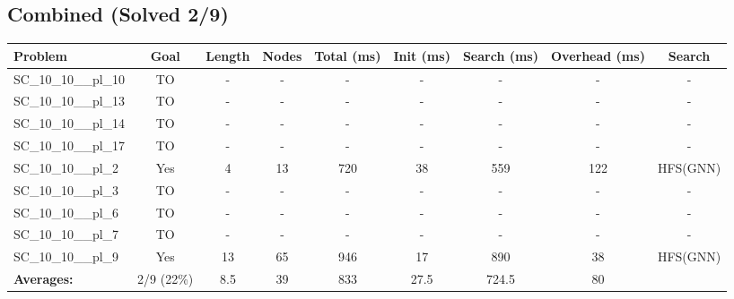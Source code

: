 \documentclass{article}
\begin{document}
\subsection*{Combined (Solved 2/9)}
\begin{tabular}{lcccccccc}
\toprule
Problem & Goal & Length & Nodes & Total (ms) & Init (ms) & Search (ms) & Overhead (ms) & Search \\
\midrule
SC\_10\_10\_\_pl\_10 & TO & - & - & - & - & - & - & - \\
SC\_10\_10\_\_pl\_13 & TO & - & - & - & - & - & - & - \\
SC\_10\_10\_\_pl\_14 & TO & - & - & - & - & - & - & - \\
SC\_10\_10\_\_pl\_17 & TO & - & - & - & - & - & - & - \\
SC\_10\_10\_\_pl\_2 & Yes & 4 & 13 & 720 & 38 & 559 & 122 & HFS(GNN) \\
SC\_10\_10\_\_pl\_3 & TO & - & - & - & - & - & - & - \\
SC\_10\_10\_\_pl\_6 & TO & - & - & - & - & - & - & - \\
SC\_10\_10\_\_pl\_7 & TO & - & - & - & - & - & - & - \\
SC\_10\_10\_\_pl\_9 & Yes & 13 & 65 & 946 & 17 & 890 & 38 & HFS(GNN) \\
\textbf{Averages:} & 2/9 (22\%) & 8.5 & 39 & 833 & 27.5 & 724.5 & 80 & \\
\bottomrule
\end{tabular}
\\[0.7cm]
\end{document}
